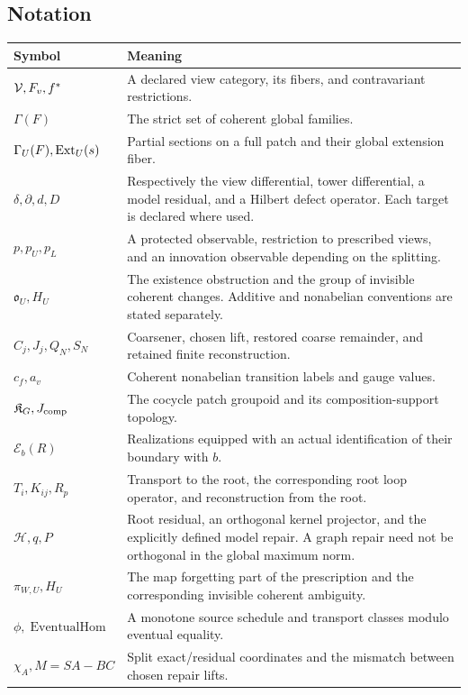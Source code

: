 \documentclass[11pt,oneside,openany]{book}
\numberwithin{equation}{section}
\begin{document}
\subsection{Notation}
\begin{longtable}{@{}p{.25\linewidth}p{.7\linewidth}@{}}
\toprule
Symbol & Meaning\\\midrule\endhead
\(\mathcal V,F_v,f^*\) & A declared view category, its fibers, and contravariant restrictions.\\
\(\Gamma(F)\) & The strict set of coherent global families.\\
\(\Gamma_U(F),\operatorname{Ext}_U(s)\) & Partial sections on a full patch and their global extension fiber.\\
\(\delta,\partial,d,D\) & Respectively the view differential, tower differential, a model residual, and a Hilbert defect operator. Each target is declared where used.\\
\(p,p_U,p_L\) & A protected observable, restriction to prescribed views, and an innovation observable depending on the splitting.\\
\(\mathfrak o_U,H_U\) & The existence obstruction and the group of invisible coherent changes. Additive and nonabelian conventions are stated separately.\\
\(C_j,J_j,Q_N,S_N\) & Coarsener, chosen lift, restored coarse remainder, and retained finite reconstruction.\\
\(c_f,a_v\) & Coherent nonabelian transition labels and gauge values.\\
\(\mathfrak K_G,J_{\rm comp}\) & The cocycle patch groupoid and its composition-support topology.\\
\(\mathcal E_b(R)\) & Realizations equipped with an actual identification of their boundary with \(b\).\\
\(T_i,K_{ij},R_p\) & Transport to the root, the corresponding root loop operator, and reconstruction from the root.\\
\(\mathcal H,q,P\) & Root residual, an orthogonal kernel projector, and the explicitly defined model repair. A graph repair need not be orthogonal in the global maximum norm.\\
\(\pi_{W,U},H_U\) & The map forgetting part of the prescription and the corresponding invisible coherent ambiguity.\\
\(\phi,\operatorname{EventualHom}\) & A monotone source schedule and transport classes modulo eventual equality.\\
\(\chi_A,M=SA-BC\) & Split exact/residual coordinates and the mismatch between chosen repair lifts.\\

\end{longtable}
\end{document}
